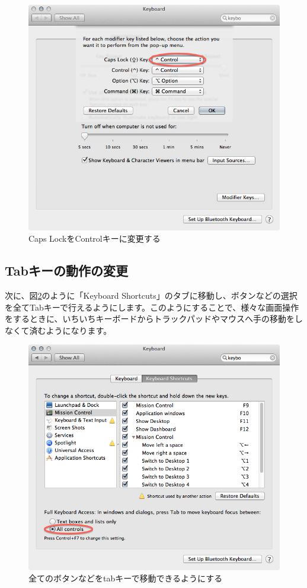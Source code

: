 \begin{figure}
  \centering
  \includegraphics[scale=0.35]{fig/Keyboard1.png}
  \caption{Caps LockをControlキーに変更する}
  \label{fig:Keyboard1_png}
\end{figure}

\subsection{Tabキーの動作の変更}
次に、図\ref{fig:Keyboard2_png}のように「Keyboard Shortcuts」のタブに移動し、ボタンなどの選択を全てTabキーで行えるようにします。このようにすることで、様々な画面操作をするときに、いちいちキーボードからトラックパッドやマウスへ手の移動をしなくて済むようになります。

\begin{figure}
  \centering
  \includegraphics[scale=0.35]{fig/Keyboard2.png}
  \caption{全てのボタンなどをtabキーで移動できるようにする}
  \label{fig:Keyboard2_png}
\end{figure}


